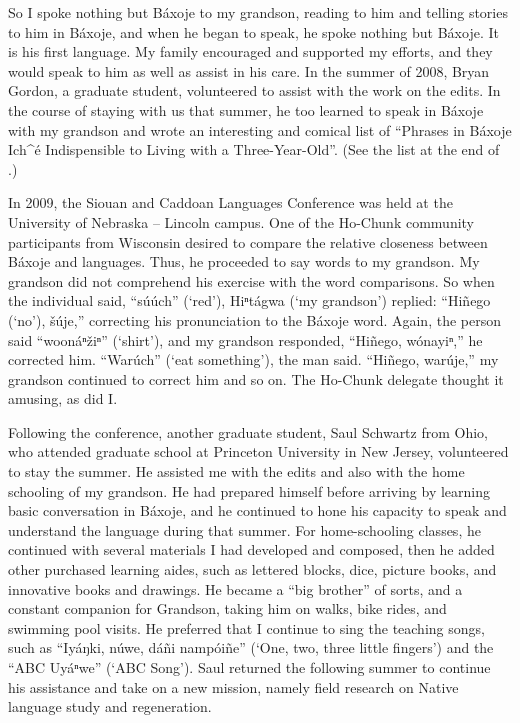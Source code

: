\documentclass[output=paper]{LSP/langsci}
\begin{document}
So I spoke nothing but Báxoje to my grandson, reading to him and telling stories to him in Báxoje, and when he began to speak, he spoke nothing but Báxoje. It is his first language. My family encouraged and supported my efforts, and they would speak to him as well as assist in his care. In the summer of 2008, Bryan Gordon, a graduate student, volunteered to assist with the work on the  edits. In the course of staying with us that summer, he too learned to speak in Báxoje with my grandson and wrote an interesting and comical list of ``Phrases in Báxoje Ich\^{ }é Indispensible to Living with a Three-Year-Old''. (See the list at the end of .)

In 2009, the Siouan and Caddoan Languages Conference was held at the University of Nebraska -- Lincoln campus. One of the Ho-Chunk community participants from Wisconsin desired to compare the relative closeness between Báxoje and  languages. Thus, he proceeded to say  words to my grandson. My grandson did not comprehend his exercise with the word comparisons. So when the individual said, ``súúch'' (`red'), Hiⁿtágwa (`my grandson') replied: ``Hiñego (`no'), šúje,'' correcting his pronunciation to the Báxoje word. Again, the person said ``woonáⁿ\v{z}iⁿ'' (`shirt'), and my grandson responded, ``Hiñego, wónayiⁿ,'' he corrected him. ``Warúch'' (`eat something'), the man said. ``Hiñego, warúje,'' my grandson continued to correct him and so on. The Ho-Chunk delegate thought it amusing, as did I.

Following the conference, another graduate student, Saul Schwartz from Ohio, who attended graduate school at Princeton University in New Jersey, volunteered to stay the summer. He assisted me with the  edits and also with the home schooling of my grandson. He had prepared himself before arriving by learning basic conversation in Báxoje, and he continued to hone his capacity to speak and understand the language during that summer. For home-schooling classes, he continued with several materials I had developed and composed, then he added other purchased learning aides, such as lettered blocks, dice, picture books, and innovative books and drawings. He became a ``big brother'' of sorts, and a constant companion for Grandson, taking him on walks, bike rides, and swimming pool visits. He preferred that I continue to sing the teaching songs, such as ``Iyáŋki, núwe, dáñi nampóiñe'' (`One, two, three little fingers') and the ``ABC Uyáⁿwe'' (`ABC Song'). Saul returned the following summer to continue his assistance and take on a new mission, namely field research on Native language study and regeneration.  
\end{document}
